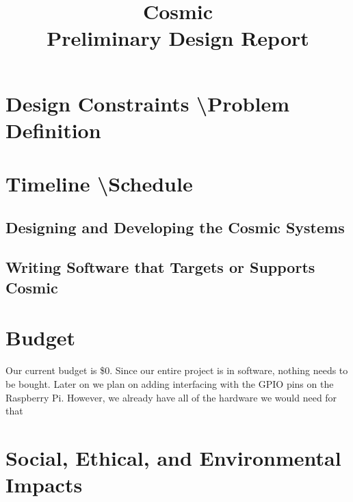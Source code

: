 \documentclass[conference]{IEEEtran}
\begin{document}
\title{
 Cosmic\\Preliminary Design Report}

\author{
\and
{}

}

\maketitle

\section{Design Constraints \textbackslash Problem Definition}


\section{Timeline \textbackslash Schedule}

\subsection{Designing and Developing the Cosmic Systems}

\subsection{Writing Software that Targets or Supports Cosmic}

\section{Budget}

Our current budget is \$0. Since our entire project is in software, nothing needs to be bought. Later on we plan on adding interfacing with the GPIO pins on the Raspberry Pi. However, we already have all of the hardware we would need for that
\section{Social, Ethical, and Environmental Impacts} 
\end{document}
